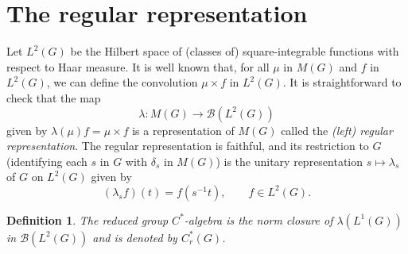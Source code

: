 \documentclass{book}
\newtheorem{definition}{Definition}[section]
\def\cstar{\(C^*\)-algebra}
\begin{document}
\section{The regular representation}
Let \(L^2(G)\) be the Hilbert space of (classes of) square-integrable functions with
respect to Haar measure. It is well known that, for all \(\mu\) in \(M(G)\) and \(f\) in
\(L^2(G)\), we can define the convolution \(\mu \times f\) in \(L^2(G)\). It is straightforward to
check that the map
\[
  \lambda:M(G)\rightarrow\mathcal{B}(L^2(G))
\]
given by \(\lambda(\mu)f=\mu\times f\) is a representation of \(M(G)\) called the \textit{(left) regular representation}.
The regular representation is faithful, and its restriction to \(G\)
(identifying each \(s\) in \(G\) with \(\delta_s\) in \(M(G)\)) is the unitary representation \(s \mapsto \lambda_s\)
of \(G\) on \(L^2(G)\) given by
\[
  (\lambda_s f)(t)=f(s^{-1}t),\qquad f\in L^2(G).
\]
\begin{definition}
  The \textnormal{reduced group \cstar} is the norm closure of \(\lambda(L^1(G))\) in \(\mathcal{B}(L^2(G))\)
  and is denoted by \(C_r^*(G)\).
\end{definition}
\end{document}
